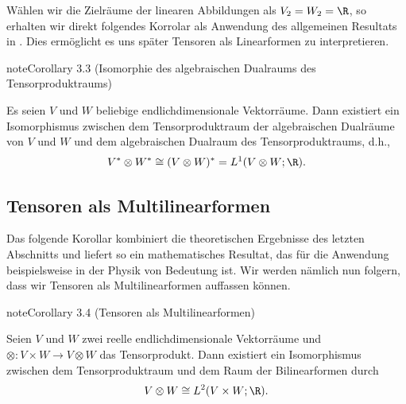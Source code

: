 \documentclass[letterpaper,10pt,german]{jupyterBook}
\begin{document}
\sphinxAtStartPar
Wählen wir die Zielräume der linearen Abbildungen als \(V_2 = W_2 = \R\), so erhalten wir direkt folgendes Korrolar als Anwendung des allgemeinen Resultats in {\hyperref[\detokenize{vektoranalysis/tensor:thm:pIsomorphismus}]{}}.
Dies ermöglicht es uns später Tensoren als Linearformen zu interpretieren.
\label{vektoranalysis/tensor:cor:tensorenLinearformen}
\begin{sphinxadmonition}{note}{Corollary 3.3 (Isomorphie des algebraischen Dualraums des Tensorproduktraums)}



\sphinxAtStartPar
Es seien \(V\) und \(W\) beliebige endlich\sphinxhyphen{}dimensionale Vektorräume.
Dann existiert ein Isomorphismus zwischen dem Tensorproduktraum der algebraischen Dualräume von \(V\) und \(W\) und dem algebraischen Dualraum des Tensorproduktraums, d.h.,
\begin{equation*}
\begin{split}V^\ast \otimes W^\ast \cong (V\otimes W)^\ast = L^1(V \otimes W; \R).\end{split}
\end{equation*}\end{sphinxadmonition}


\subsection{Tensoren als Multilinearformen}
\label{\detokenize{vektoranalysis/tensor:tensoren-als-multilinearformen}}
\sphinxAtStartPar
Das folgende Korollar kombiniert die theoretischen Ergebnisse des letzten Abschnitts und liefert so ein mathematisches Resultat, das für die Anwendung beispielsweise in der Physik von Bedeutung ist.
Wir werden nämlich nun folgern, dass wir Tensoren als Multilinearformen auffassen können.
\label{vektoranalysis/tensor:cor:tensorMultilinearform}
\begin{sphinxadmonition}{note}{Corollary 3.4 (Tensoren als Multilinearformen)}



\sphinxAtStartPar
Seien \(V\) und \(W\) zwei reelle endlich\sphinxhyphen{}dimensionale Vektorräume und \(\otimes \colon V \times W \rightarrow V \otimes W\) das Tensorprodukt.
Dann existiert ein Isomorphismus zwischen dem Tensorproduktraum und dem Raum der Bilinearformen durch
\begin{equation*}
\begin{split}V \otimes W \cong L^2(V \times W; \R).\end{split}
\end{equation*}\end{sphinxadmonition}
\end{document}
